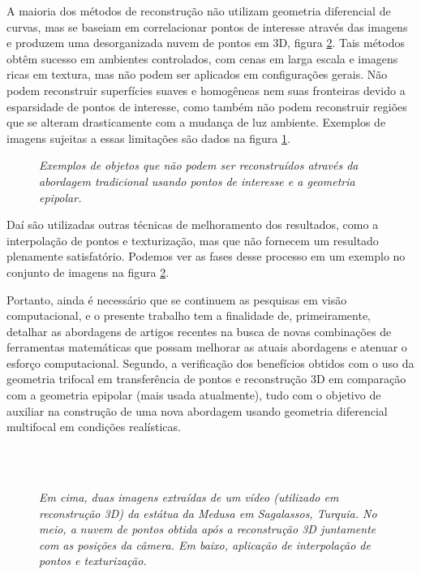 A maioria dos métodos de reconstrução não utilizam geometria diferencial de curvas, mas se baseiam em correlacionar pontos de interesse através das imagens e produzem uma desorganizada nuvem de pontos em 3D, figura \ref{fig.medusa}. Tais métodos obtêm sucesso em ambientes controlados, com cenas em larga escala e imagens ricas em textura, mas não podem ser aplicados em configurações gerais. Não podem reconstruir superfícies suaves e homogêneas nem suas fronteiras devido a esparsidade de pontos de interesse, como também não podem reconstruir regiões que se alteram drasticamente com a mudança de luz ambiente. Exemplos de imagens sujeitas a essas limitações são dados na figura \ref{fig.carro-objeto-curvo}.
\begin{figure}[!htb]
\centering
{}
\quad
{}
\caption{{\it Exemplos de objetos que não podem ser reconstruídos através da abordagem tradicional usando pontos de interesse e a geometria epipolar.}}
\label{fig.carro-objeto-curvo}
\end{figure}  
Daí são utilizadas outras técnicas de melhoramento dos resultados, como a interpolação de pontos e texturização, mas que não fornecem um resultado plenamente satisfatório. Podemos ver as fases desse processo em um exemplo no conjunto de imagens na figura \ref{fig.medusa}.

Portanto, ainda é necessário que se continuem as pesquisas em visão computacional, e o presente trabalho tem a finalidade de, primeiramente, detalhar as abordagens de artigos recentes na busca de novas combinações de ferramentas matemáticas que possam melhorar as atuais abordagens e atenuar o esforço computacional. Segundo, a verificação dos benefícios obtidos com o uso da geometria trifocal em transferência de pontos e reconstrução 3D em comparação com a geometria epipolar (mais usada atualmente), tudo com o objetivo de auxiliar na construção de uma nova abordagem usando geometria diferencial multifocal em condições realísticas.

\begin{figure}[!htb]
\centering
{}
\quad
{}
\\
\quad
{}
\\
\quad
{}
\caption{{\it Em cima, duas imagens extraídas de um vídeo (utilizado em reconstrução 3D) da estátua da Medusa em Sagalassos, Turquia. No meio, a nuvem de pontos obtida após a reconstrução 3D juntamente com as posições da câmera. Em baixo, aplicação de interpolação de pontos e texturização.}}
\label{fig.medusa}
\end{figure}

